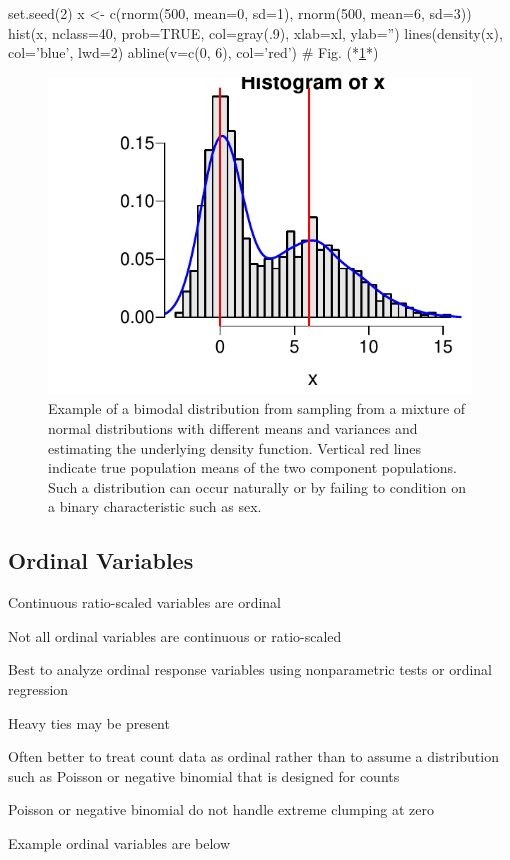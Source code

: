 \begin{Schunk}
\begin{Sinput}
set.seed(2)
x <- c(rnorm(500, mean=0, sd=1), rnorm(500, mean=6, sd=3))
hist(x, nclass=40, prob=TRUE, col=gray(.9), xlab=xl, ylab='')
lines(density(x), col='blue', lwd=2)
abline(v=c(0, 6), col='red')   # Fig. (*\ref{fig:descript-bimode}*)
\end{Sinput}
\begin{figure}[htbp]

\centerline{\includegraphics[width=\maxwidth]{descript-bimode-1} }

\caption[Bimodal distribution]{Example of a bimodal distribution from sampling from a mixture of normal distributions with different means and variances and estimating the underlying density function.  Vertical red lines indicate true population means of the two component populations.  Such a distribution can occur naturally or by failing to condition on a binary characteristic such as sex.}\label{fig:descript-bimode}
\end{figure}
\end{Schunk}

\subsection{Ordinal Variables}
\bi
\item Continuous ratio-scaled variables are ordinal
\item Not all ordinal variables are continuous or ratio-scaled
\item Best to analyze ordinal response variables using nonparametric tests or ordinal regression
\item Heavy ties may be present
\item Often better to treat count data as ordinal rather than to assume a distribution such as Poisson or negative binomial that is designed for counts
 \bi
 \item Poisson or negative binomial do not handle extreme clumping at zero
 \ei
\item Example ordinal variables are below
\ei

